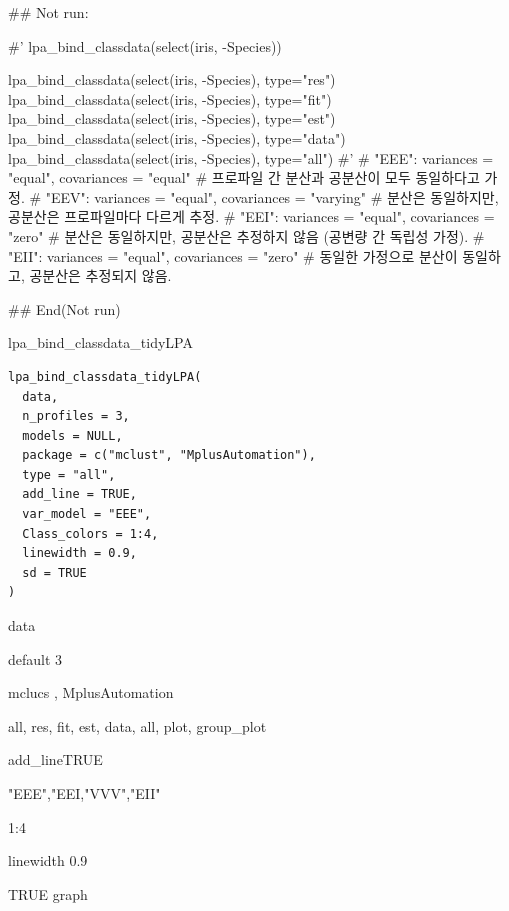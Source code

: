 \documentclass[a4paper]{book}
\begin{document}
\begin{Examples}
\begin{ExampleCode}

\#\# Not run: 

#'
lpa_bind_classdata(select(iris, -Species))

lpa_bind_classdata(select(iris, -Species), type="res")
lpa_bind_classdata(select(iris, -Species), type="fit")
lpa_bind_classdata(select(iris, -Species), type="est")
lpa_bind_classdata(select(iris, -Species), type="data")%
lpa_bind_classdata(select(iris, -Species), type="all")
#'
# "EEE": variances = "equal", covariances = "equal"
# 프로파일 간 분산과 공분산이 모두 동일하다고 가정.
# "EEV": variances = "equal", covariances = "varying"
# 분산은 동일하지만, 공분산은 프로파일마다 다르게 추정.
# "EEI": variances = "equal", covariances = "zero"
# 분산은 동일하지만, 공분산은 추정하지 않음 (공변량 간 독립성 가정).
# "EII": variances = "equal", covariances = "zero"
# 동일한 가정으로 분산이 동일하고, 공분산은 추정되지 않음.

## End(Not run)



\end{ExampleCode}
\end{Examples}
%
\begin{Description}
lpa\_bind\_classdata\_tidyLPA
\end{Description}
%
\begin{Usage}
\begin{verbatim}
lpa_bind_classdata_tidyLPA(
  data,
  n_profiles = 3,
  models = NULL,
  package = c("mclust", "MplusAutomation"),
  type = "all",
  add_line = TRUE,
  var_model = "EEE",
  Class_colors = 1:4,
  linewidth = 0.9,
  sd = TRUE
)
\end{verbatim}
\end{Usage}
%
\begin{Arguments}
\begin{ldescription}
\item[\code{data}] data

\item[\code{n\_profiles}] default 3

\item[\code{package}] mclucs , MplusAutomation

\item[\code{type}] all, res, fit, est, data, all, plot, group\_plot

\item[\code{add\_line}] add\_lineTRUE

\item[\code{var\_model}] "EEE","EEI,"VVV","EII"

\item[\code{Class\_colors}] 1:4

\item[\code{linewidth}] linewidth 0.9

\item[\code{sd}] TRUE graph
\end{ldescription}
\end{Arguments}
\end{document}
